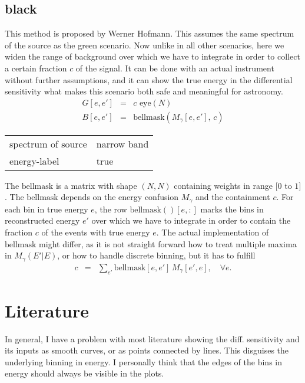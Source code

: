 \documentclass{article}%
\begin{document}
        \subsection{black}
            This method is proposed by Werner Hofmann.
            This assumes the same spectrum of the source as the green scenario.
            Now unlike in all other scenarios, here we widen the range of background over which we have to integrate in order to collect a certain fraction $c$ of the signal.
            It can be done with an actual instrument without further assumptions, and it can show the true energy in the differential sensitivity what makes this scenario both safe and meaningful for astronomy.
            \begin{eqnarray}
                G[e, e'] &=& c \, \, \mathrm{eye}(N)
                \\
                B[e, e'] &=& \mathrm{bellmask}(M_{\gamma}[e, e'], \, c)
            \end{eqnarray}
            \begin{center}
                \begin{tabular}{ll}
                    spectrum of source & narrow band\\
                    energy-label & true\\
                \end{tabular}
            \end{center}
            The $\mathrm{bellmask}$ is a matrix with shape $(N,N)$ containing weights in range $[0$ to $1]$.
            The $\mathrm{bellmask}$ depends on the energy confusion $M_{\gamma}$ and the containment $c$.
            For each bin in true energy $e$, the row $\mathrm{bellmask}()[e, :]$ marks the bins in reconstructed energy $e'$ over which we have to integrate in order to contain the fraction $c$ of the events with true energy $e$.
            The actual implementation of $\mathrm{bellmask}$ might differ, as it is not straight forward how to treat multiple maxima in $M_\gamma(E'\vert E)$, or how to handle discrete binning, but it has to fulfill
            \begin{eqnarray}
                c &=& \sum_{e'} \mathrm{bellmask}[e ,e'] \, M_{\gamma}[e', e], \,\,\,\,\,\, \forall e.
            \end{eqnarray}
    \section{Literature}
        In general, I have a problem with most literature showing the diff. sensitivity and its inputs as smooth curves,
        or as points connected by lines. This disguises the underlying binning in energy. I personally think that the edges of the bins in energy should always be visible in the plots.
\end{document}
